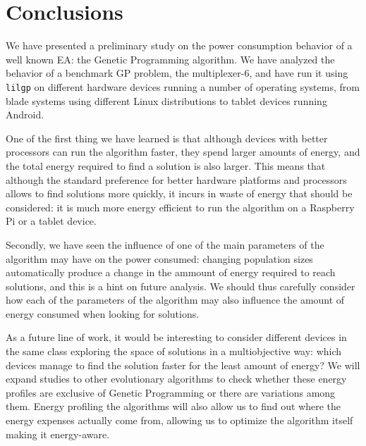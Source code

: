 \section{Conclusions}
\label{conclusions}

We have presented a preliminary study on the power consumption
behavior of a well known EA: the Genetic Programming algorithm.  We
have analyzed the behavior of a benchmark GP problem, the
multiplexer-6, and have run it using {\tt lilgp} on different
hardware devices running a number of operating systems, from blade
systems using different Linux distributions to tablet devices running
Android. 

One of the first thing we have learned is that although devices with
better processors can run the algorithm faster, they spend
larger amounts of energy, and the total energy required to find a
solution is also larger.  This means that although the standard
preference for better hardware platforms and processors allows to find
solutions more quickly, it incurs in waste of energy that should be
considered:  it is much more energy efficient to run the algorithm on
a Raspberry Pi or a tablet device. 

Secondly, we have seen the influence of one of the main parameters
of the algorithm may have on the power consumed:  changing population
sizes automatically produce a change in the ammount of energy required to reach
solutions, and this is a hint on future analysis.  We should thus carefully
consider how each of the parameters of the algorithm may also
influence the amount of energy consumed when looking for solutions. 

As a future line of work, it would be interesting to consider
different devices in the same class exploring the space of
solutions in a multiobjective way: which devices manage to find the
solution faster for the least amount of energy? We will expand studies
to other evolutionary algorithms to check whether these energy
profiles are exclusive of Genetic Programming or there are variations
among them. Energy profiling the algorithms will also allow us to find
out where the energy expenses actually come from, allowing us to
optimize the algorithm itself making it energy-aware.